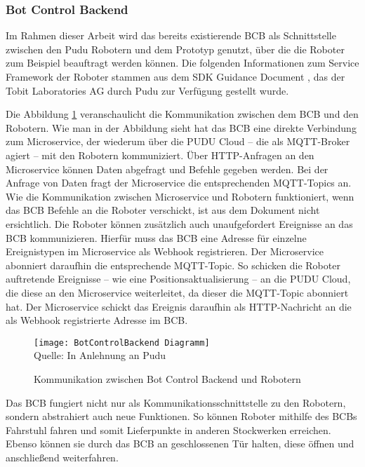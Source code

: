 \subsubsection{Bot Control Backend}\label{sec:BotControlBackend}
Im Rahmen dieser Arbeit wird das bereits existierende \ac{BCB} als Schnittstelle zwischen den Pudu Robotern und dem Prototyp genutzt, über die die Roboter zum Beispiel beauftragt werden können. Die folgenden Informationen zum Service Framework der Roboter stammen aus dem SDK Guidance Document \cite{PuduSDK}, das der Tobit Laboratories AG durch Pudu zur Verfügung gestellt wurde.

Die Abbildung \ref{fig:BotControlBackendCommunication} veranschaulicht die Kommunikation zwischen dem \ac{BCB} und den Robotern. Wie man in der Abbildung sieht hat das \ac{BCB} eine direkte Verbindung zum \gls{Microservice}, der wiederum über die PUDU Cloud – die als \gls{MQTT-Broker} agiert – mit den Robotern kommuniziert. Über \gls{HTTP}-Anfragen an den \gls{Microservice} können Daten abgefragt und Befehle gegeben werden. Bei der Anfrage von Daten fragt der \gls{Microservice} die entsprechenden \gls{MQTT}-Topics an. Wie die Kommunikation zwischen \gls{Microservice} und Robotern funktioniert, wenn das \ac{BCB} Befehle an die Roboter verschickt, ist aus dem Dokument nicht ersichtlich. Die Roboter können zusätzlich auch unaufgefordert Ereignisse an das \ac{BCB} kommunizieren. Hierfür muss das \ac{BCB} eine Adresse für einzelne Ereignistypen im \gls{Microservice} als \gls{Webhook} registrieren. Der \gls{Microservice} abonniert daraufhin die entsprechende \gls{MQTT-Topic}. So schicken die Roboter auftretende Ereignisse – wie eine Positionsaktualisierung – an die PUDU Cloud, die diese an den \gls{Microservice} weiterleitet, da dieser die \gls{MQTT-Topic} abonniert hat. Der \gls{Microservice} schickt das Ereignis daraufhin als \gls{HTTP}-Nachricht an die als \gls{Webhook} registrierte Adresse im \ac{BCB}.

\begin{figure}[H]
\caption{Kommunikation zwischen Bot Control Backend und Robotern}\label{fig:BotControlBackendCommunication}
\texttt{[image: BotControlBackend Diagramm]}
\\
Quelle: In Anlehnung an Pudu \cite[S.~4]{PuduSDK}
\end{figure}

Das \ac{BCB} fungiert nicht nur als Kommunikationsschnittstelle zu den Robotern, sondern abstrahiert auch neue Funktionen. So können Roboter mithilfe des \ac{BCB}s Fahrstuhl fahren und somit Lieferpunkte in anderen Stockwerken erreichen. Ebenso können sie durch das \ac{BCB} an geschlossenen Tür halten, diese öffnen und anschließend weiterfahren.

